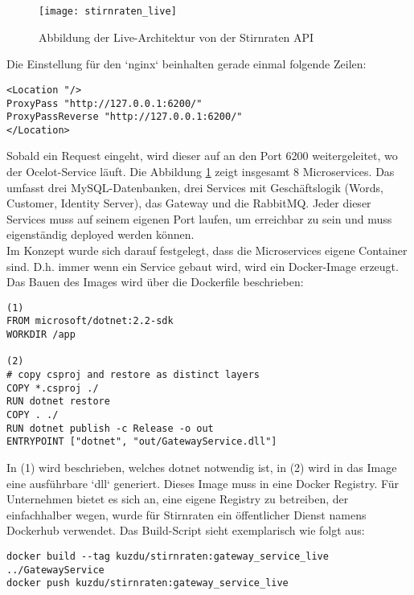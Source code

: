 \begin{figure}[ht]
	\centering
	\texttt{[image: stirnraten\_live]}
	\caption[Stirnraten Live Architektur] {Abbildung der Live-Architektur von der Stirnraten API}
	\label{fig:stirnraten_live}
\end{figure} 

Die Einstellung für den `nginx` beinhalten gerade einmal folgende Zeilen: 

\begin{verbatim}
<Location "/>
ProxyPass "http://127.0.0.1:6200/"
ProxyPassReverse "http://127.0.0.1:6200/"
</Location>
\end{verbatim}

Sobald ein Request eingeht, wird dieser auf an den Port 6200 weitergeleitet, wo der Ocelot-Service läuft. Die Abbildung \ref{fig:stirnraten_live} zeigt insgesamt 8 Microservices. Das umfasst drei MySQL-Datenbanken, drei Services mit Geschäftslogik (Words, Customer, Identity Server), das Gateway und die RabbitMQ. Jeder dieser Services muss auf seinem eigenen Port laufen, um erreichbar zu sein und muss eigenständig deployed werden können.\\

Im Konzept wurde sich darauf festgelegt, dass die Microservices eigene Container sind. D.h. immer wenn ein Service gebaut wird, wird ein Docker-Image erzeugt. Das Bauen des Images wird über die Dockerfile beschrieben: 

\begin{verbatim}
(1)
FROM microsoft/dotnet:2.2-sdk
WORKDIR /app

(2)
# copy csproj and restore as distinct layers
COPY *.csproj ./
RUN dotnet restore
COPY . ./
RUN dotnet publish -c Release -o out
ENTRYPOINT ["dotnet", "out/GatewayService.dll"]
\end{verbatim}

In (1) wird beschrieben, welches dotnet notwendig ist, in (2) wird in das Image eine ausführbare `dll` generiert. Dieses Image muss in eine Docker Registry. Für Unternehmen bietet es sich an, eine eigene Registry zu betreiben, der einfachhalber wegen, wurde für Stirnraten ein öffentlicher Dienst namens Dockerhub verwendet. Das Build-Script sieht exemplarisch wie folgt aus: 

\begin{verbatim}
docker build --tag kuzdu/stirnraten:gateway_service_live ../GatewayService
docker push kuzdu/stirnraten:gateway_service_live
\end{verbatim}

